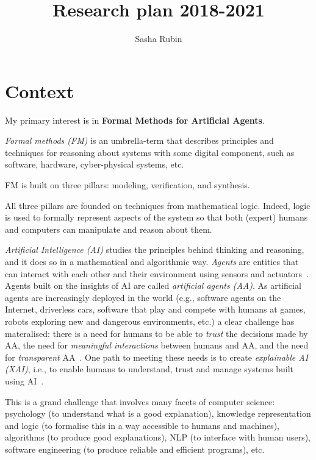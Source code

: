\documentclass[a4paper,10pt]{article}
\title{Research plan 2018-2021}
\author{Sasha Rubin}
\date{}
\begin{document}
\maketitle

\section{Context}\label{sec:context}
My primary interest is in \textbf{Formal Methods for Artificial Agents}.

\emph{Formal methods (FM)} is an umbrella-term that describes principles and techniques for reasoning 
about systems with some digital component, such as software, hardware, cyber-physical systems, etc.
\begin{framed}
\noindent FM is built on three pillars: modeling, verification, and synthesis.  
\end{framed}
All three pillars are founded 
on techniques from mathematical logic. Indeed, logic is used to formally represent 
aspects of the system so that both (expert) humans and computers can 
manipulate and reason about them.

\emph{Artificial Intelligence (AI)} studies the principles behind thinking and reasoning, and it does so 
in a mathematical and algorithmic way. \emph{Agents} are entities that can interact with each other and 
their environment using sensors and actuators~\cite{RuNo10}.
Agents built on the insights of AI are called \emph{artificial agents (AA)}. 
As artificial agents are increasingly deployed in the world (e.g., 
software agents on the Internet, driverless cars, software that play and compete with humans at games, 
robots exploring new and dangerous environments, etc.) a clear challenge has materalised: 
there is a need for humans to be able to \emph{trust} 
the decisions made by AA, the need for \emph{meaningful interactions} between humans and AA, 
and the need for \emph{transparent} AA~\cite{ACMStatement07}. One path to meeting these needs is 
to create \emph{explainable AI (XAI)}, i.e., to enable humans to understand, trust and manage systems built 
using AI~\cite{DARPA}.

This is a grand challenge that involves many facets of computer science: psychology (to understand what is a good explanation), 
knowledge representation and logic (to formalise this in a way accessible to humans and machines), 
algorithms (to produce good explanations), NLP (to interface 
with human users), software engineering (to produce reliable and efficient programs), etc.
\end{document}
